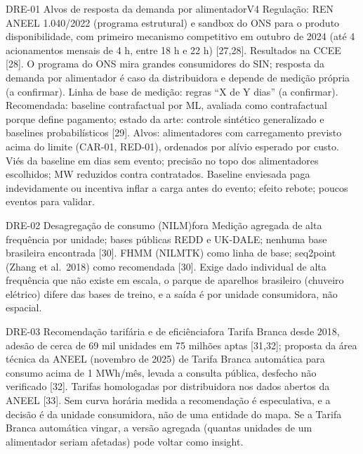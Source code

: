 \begin{ficha}{DRE-01 \textperiodcentered{} Alvos de resposta da demanda por alimentador}{V4}
 Regulação: REN ANEEL 1.040/2022 (programa estrutural) e sandbox
do ONS para o produto disponibilidade, com primeiro mecanismo competitivo em
outubro de 2024 (até 4 acionamentos mensais de 4 h, entre 18 h e 22 h)
[27,28]. Resultados na CCEE [28]. O programa do ONS mira grandes consumidores
do SIN; resposta da demanda por alimentador é caso da distribuidora e depende
de medição própria (a confirmar).
 Linha de base de medição: regras ``X de Y dias'' (a
confirmar). Recomendada: baseline contrafactual por ML, avaliada como
contrafactual porque define pagamento; estado da arte: controle sintético
generalizado e baselines probabilísticos [29]. Alvos: alimentadores com
carregamento previsto acima do limite (CAR-01, RED-01), ordenados por alívio
esperado por custo.
 Viés da baseline em dias sem evento; precisão no topo dos
alimentadores escolhidos; MW reduzidos contra contratados.
 Baseline enviesada paga indevidamente ou incentiva inflar
a carga antes do evento; efeito rebote; poucos eventos para validar.
\end{ficha}

\begin{ficha}{DRE-02 \textperiodcentered{} Desagregação de consumo (NILM)}{fora}
 Medição agregada de alta frequência por unidade; bases públicas
REDD e UK-DALE; nenhuma base brasileira encontrada [30].
 FHMM (NILMTK) como linha de base; seq2point (Zhang et
al.\ 2018) como recomendada [30].
 Exige dado individual de alta frequência que não
existe em escala, o parque de aparelhos brasileiro (chuveiro elétrico) difere
das bases de treino, e a saída é por unidade consumidora, não espacial.
\end{ficha}

\begin{ficha}{DRE-03 \textperiodcentered{} Recomendação tarifária e de eficiência}{fora}
 Tarifa Branca desde 2018, adesão de cerca de 69 mil unidades em
75 milhões aptas [31,32]; proposta da área técnica da ANEEL (novembro de 2025)
de Tarifa Branca automática para consumo acima de 1 MWh/mês, levada a consulta
pública, desfecho não verificado [32]. Tarifas homologadas por distribuidora
nos dados abertos da ANEEL [33].
 Sem curva horária medida a recomendação é
especulativa, e a decisão é da unidade consumidora, não de uma entidade do
mapa. Se a Tarifa Branca automática vingar, a versão agregada (quantas
unidades de um alimentador seriam afetadas) pode voltar como insight.
\end{ficha}

